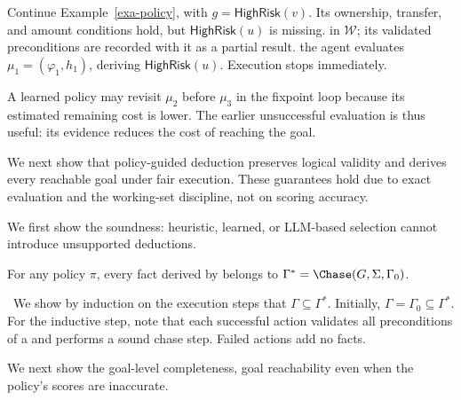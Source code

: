 \begin{example}
\label{exa-execution}
Continue Example~\ref{exa-policy}, with
$g=\textsf{HighRisk}(v)$.
Its ownership, transfer, and amount
conditions hold, but
$\textsf{HighRisk}(u)$ is missing.
in $\mathcal W$; its validated
preconditions are recorded with it as a
partial result.
 the agent evaluates
$\mu_1=(\varphi_1,h_1)$, deriving
$\textsf{HighRisk}(u)$.
Execution stops immediately.

A learned policy may
revisit $\mu_2$ before $\mu_3$ in the
fixpoint loop
because its estimated remaining cost is
lower. The earlier unsuccessful evaluation
is thus useful: its evidence reduces
the cost of reaching the goal.
\end{example}
\vspace{-1.4ex}

We next show that policy-guided deduction
preserves logical validity and derives
every reachable goal under fair execution.
These guarantees hold due to exact \GAR
evaluation and the working-set discipline,
not on scoring accuracy.

We first show the soundness: heuristic, learned, or LLM-based
selection cannot introduce unsupported
deductions.

\begin{theorem}
\label{thm-sound}
For any policy $\pi$, every fact derived
by \AdaDeduce belongs to
$\Gamma^*=\Chase(G,\Sigma,\Gamma_0)$.
\end{theorem}
\vspace{-1ex}

\proofS~We show by induction on the execution steps 
that $\Gamma\subseteq\Gamma^*$.
Initially, $\Gamma=\Gamma_0\subseteq\Gamma^*$.
For the inductive step, note that 
each successful action validates all
preconditions of a \GAR and performs
a sound chase step.
Failed actions add no facts.
\eop

\vspace{0.8ex}
We next show the goal-level completeness, \ie goal reachability even
when the policy's scores are inaccurate.

